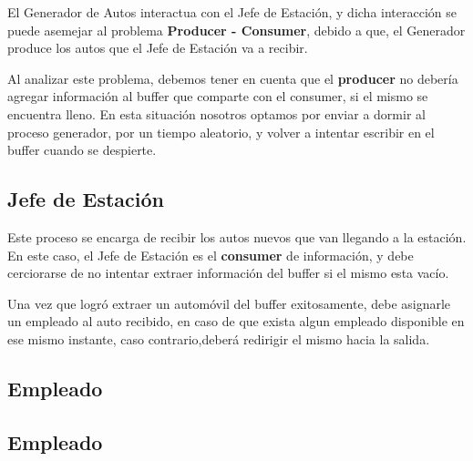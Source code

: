 \documentclass[12pt,a4paper,spanish]{article}
\begin{document}
		El Generador de Autos interactua con el Jefe de Estación, y dicha interacción se puede
		asemejar al problema \textbf{Producer - Consumer}, debido a que, el Generador produce
		los autos que el Jefe de Estación va a recibir. 

		Al analizar este problema, debemos tener en cuenta que el \textbf{producer} no debería
		agregar información al buffer que comparte con el consumer, si el mismo se encuentra lleno.
		En esta situación nosotros optamos por enviar a dormir al proceso generador, por un tiempo
		aleatorio, y volver a intentar escribir en el buffer cuando se despierte.

	\subsection{Jefe de Estación}
		Este proceso se encarga de recibir los autos nuevos que van llegando a la estación. 
		En este caso, el Jefe de Estación es el \textbf{consumer} de información, y debe
		cerciorarse de no intentar extraer información del buffer si el mismo esta vacío.

		Una vez que logró extraer un automóvil del buffer exitosamente, debe asignarle 
		un empleado al auto recibido, en caso de que exista algun empleado disponible 
		en ese mismo instante, caso contrario,deberá redirigir el mismo hacia la salida.

	\subsection{Empleado}

	\subsection{Empleado}
\end{document}
